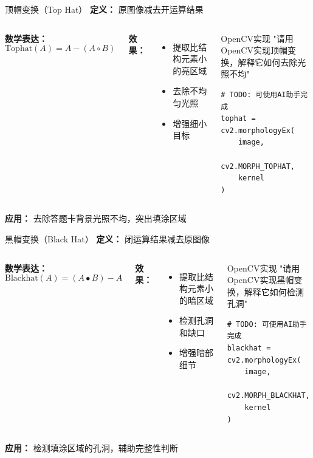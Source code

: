 \begin{frame}{顶帽变换（Top Hat）}
    \textbf{定义：} 原图像减去开运算结果

    \vspace{0.3cm}

    \begin{columns}
        \textbf{数学表达：}
        \[ \text{Tophat}(A) = A - (A \circ B) \]

        \textbf{效果：}
        \begin{itemize}
            \item 提取比结构元素小的亮区域
            \item 去除不均匀光照
            \item 增强细小目标
        \end{itemize}

        \begin{block}{OpenCV实现}
        \aihint{} "请用OpenCV实现顶帽变换，解释它如何去除光照不均"
        \begin{lstlisting}
# TODO: 可使用AI助手完成
tophat = cv2.morphologyEx(
    image,
    cv2.MORPH_TOPHAT,
    kernel
)
        \end{lstlisting}
        \end{block}
    \end{columns}

    \vspace{0.3cm}

    \textbf{应用：} 去除答题卡背景光照不均，突出填涂区域
\end{frame}

\begin{frame}{黑帽变换（Black Hat）}
    \textbf{定义：} 闭运算结果减去原图像

    \vspace{0.3cm}

    \begin{columns}
        \textbf{数学表达：}
        \[ \text{Blackhat}(A) = (A \bullet B) - A \]

        \textbf{效果：}
        \begin{itemize}
            \item 提取比结构元素小的暗区域
            \item 检测孔洞和缺口
            \item 增强暗部细节
        \end{itemize}

        \begin{block}{OpenCV实现}
        \aihint{} "请用OpenCV实现黑帽变换，解释它如何检测孔洞"
        \begin{lstlisting}
# TODO: 可使用AI助手完成
blackhat = cv2.morphologyEx(
    image,
    cv2.MORPH_BLACKHAT,
    kernel
)
        \end{lstlisting}
        \end{block}
    \end{columns}

    \vspace{0.3cm}

    \textbf{应用：} 检测填涂区域的孔洞，辅助完整性判断
\end{frame}

